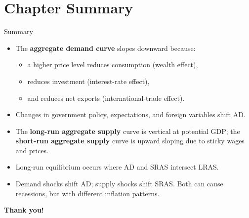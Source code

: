 \documentclass[aspectratio=169]{beamer}
\begin{document}
\section*{Chapter Summary}

\begin{frame}{Summary}
\transfade
\begin{itemize}
  \item The \textbf{aggregate demand curve} slopes downward because:
  \begin{itemize}
    \item a higher price level reduces consumption (wealth effect),
    \item reduces investment (interest-rate effect),
    \item and reduces net exports (international-trade effect).
  \end{itemize}
  \item Changes in government policy, expectations, and foreign variables shift AD.
  \item The \textbf{long-run aggregate supply} curve is vertical at potential GDP; the \textbf{short-run aggregate supply} curve is upward sloping due to sticky wages and prices.
  \item Long-run equilibrium occurs where AD and SRAS intersect LRAS.
  \item Demand shocks shift AD; supply shocks shift SRAS. Both can cause recessions, but with different inflation patterns.
\end{itemize}
\end{frame}

\begin{frame}
\centering
\Huge \textbf{Thank you!}
\end{frame}
\end{document}

